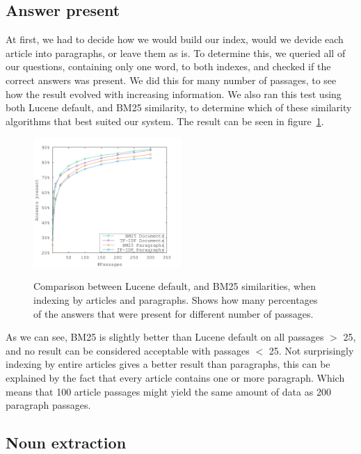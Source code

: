 \subsection{Answer present}
At first, we had to decide how we would build our index, would we devide each article into paragraphs, or leave them as is. 
To determine this, we queried all of our questions, containing only one word, to both indexes, and checked if the correct answers was present.
We did this for many number of passages, to see how the result evolved with increasing information.
We also ran this test using both Lucene default, and BM25 similarity, to determine which of these similarity algorithms that best suited our system.
The result can be seen in figure~\ref{fig:bm25_tfdf}.

\begin{figure}[h!]
  \centering
  \includegraphics[width=0.5\textwidth]{figures/bm25_tfdf.pdf}
  \label{fig:bm25_tfdf}
  \caption{Comparison between Lucene default, and BM25 similarities, when indexing by articles and paragraphs. 
  Shows how many percentages of the answers that were present for different number of passages.}
\end{figure}

As we can see, BM25 is slightly better than Lucene default on all passages $>$ 25, and no result can be considered acceptable with passages $<$ 25.
Not surprisingly indexing by entire articles gives a better result than paragraphs, 
this can be explained by the fact that every article contains one or more paragraph. 
Which means that 100 article passages might yield the same amount of data as 200 paragraph passages.

\subsection{Noun extraction}


